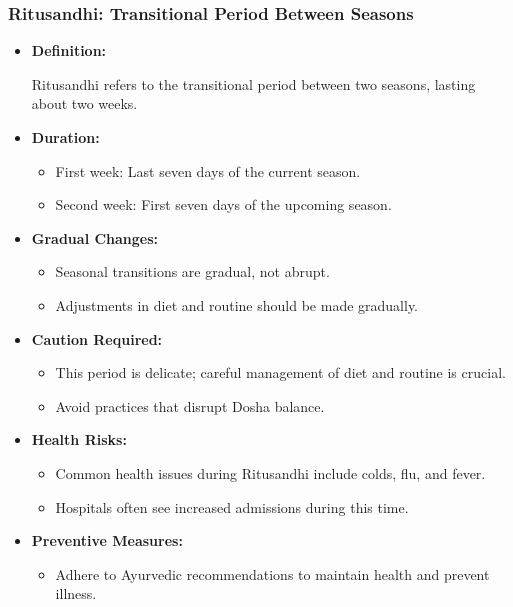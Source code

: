 \begin{frame}[fragile]\frametitle{Ritusandhi: Transitional Period Between Seasons}

      \begin{itemize}
        \item \textbf{Definition:} 
        
        Ritusandhi refers to the transitional period between two seasons, lasting about two weeks.
        
        \item \textbf{Duration:} 
        \begin{itemize}
            \item First week: Last seven days of the current season.
            \item Second week: First seven days of the upcoming season.
        \end{itemize}
        \item \textbf{Gradual Changes:} 
        \begin{itemize}
            \item Seasonal transitions are gradual, not abrupt.
            \item Adjustments in diet and routine should be made gradually.
        \end{itemize}
        \item \textbf{Caution Required:} 
        \begin{itemize}
            \item This period is delicate; careful management of diet and routine is crucial.
            \item Avoid practices that disrupt Dosha balance.
        \end{itemize}
        \item \textbf{Health Risks:} 
        \begin{itemize}
            \item Common health issues during Ritusandhi include colds, flu, and fever.
            \item Hospitals often see increased admissions during this time.
        \end{itemize}
        \item \textbf{Preventive Measures:} 
        \begin{itemize}
            \item Adhere to Ayurvedic recommendations to maintain health and prevent illness.
        \end{itemize}
      \end{itemize}

\end{frame}

